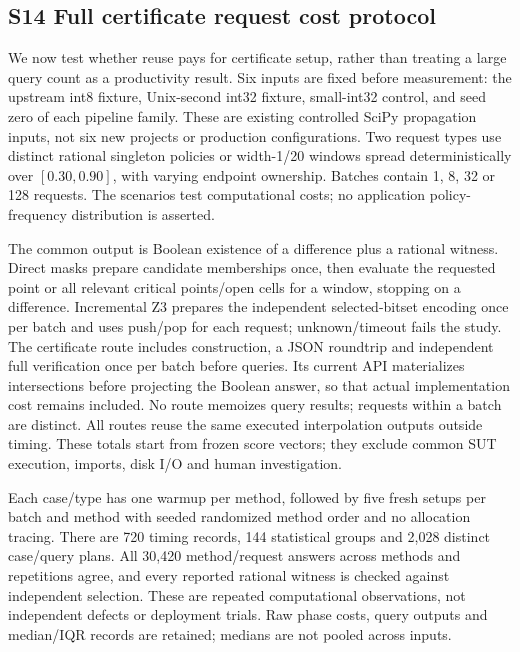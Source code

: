\documentclass[11pt,a4paper]{article}
\theoremstyle{plain}
\theoremstyle{definition}
\theoremstyle{remark}
\begin{document}
\subsection*{S14 Full certificate request cost protocol}\label{sec:s14}

We now test whether reuse pays for certificate setup, rather than treating a large query count as a productivity result. Six inputs are fixed before measurement: the upstream int8 fixture, Unix-second int32 fixture, small-int32 control, and seed zero of each pipeline family. These are existing controlled SciPy propagation inputs, not six new projects or production configurations. Two request types use distinct rational singleton policies or width-1/20 windows spread deterministically over $[0.30, 0.90]$, with varying endpoint ownership. Batches contain 1, 8, 32 or 128 requests. The scenarios test computational costs; no application policy-frequency distribution is asserted.

The common output is Boolean existence of a difference plus a rational witness. Direct masks prepare candidate memberships once, then evaluate the requested point or all relevant critical points/open cells for a window, stopping on a difference. Incremental Z3 prepares the independent selected-bitset encoding once per batch and uses push/pop for each request; unknown/timeout fails the study. The certificate route includes construction, a JSON roundtrip and independent full verification once per batch before queries. Its current API materializes intersections before projecting the Boolean answer, so that actual implementation cost remains included. No route memoizes query results; requests within a batch are distinct. All routes reuse the same executed interpolation outputs outside timing. These totals start from frozen score vectors; they exclude common SUT execution, imports, disk I/O and human investigation.

Each case/type has one warmup per method, followed by five fresh setups per batch and method with seeded randomized method order and no allocation tracing. There are 720 timing records, 144 statistical groups and 2,028 distinct case/query plans. All 30,420 method/request answers across methods and repetitions agree, and every reported rational witness is checked against independent selection. These are repeated computational observations, not independent defects or deployment trials. Raw phase costs, query outputs and median/IQR records are retained; medians are not pooled across inputs.
\end{document}

